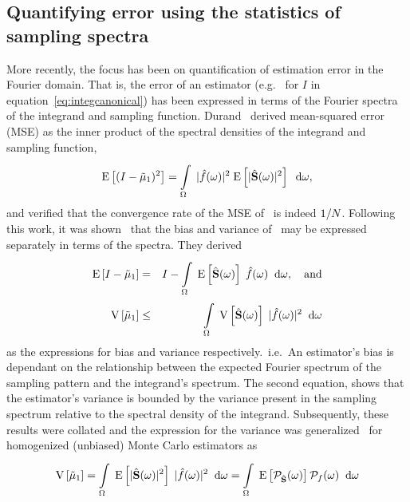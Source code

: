 \subsection{Quantifying error using the statistics of sampling spectra}
More recently, the focus has been on quantification of estimation error in the Fourier domain. That is, the error of an estimator (e.g.~ for $I$ in equation~\ref{eq:integcanonical}) has been expressed in terms of the Fourier spectra of the integrand and sampling function. 
Durand~\cite{durand2011frequency} derived mean-squared error (MSE) as the inner product of the spectral densities of the integrand and sampling function, 
\begin{equation} \label{eq:durand11}
   \mathrm{E} \left[(I-\tilde\mu_\mathrm{1})^2 \right] = \displaystyle\int\limits_{\Omega}^{} \; |\hat{f}(\omega)|^2 \; \mathrm{E} \left[|\hat{\mathbf{S}}(\omega)|^2 \right] \;\; \mathrm{d}\omega,
\end{equation}
and verified that the convergence rate of the MSE of \estim{\N}\ is indeed $1/N$. Following this work, it was shown~\cite{Subr:2013:FAS} that the bias and variance of \ may be expressed separately in terms of the spectra. They derived
\begin{eqnarray}
  \mathrm{E} \left[I-\tilde\mu_\mathrm{1} \right] &=& I - \displaystyle\int\limits_{\Omega}^{} \; \mathrm{E} \left[\hat{\mathbf{S}}(\omega) \right] \; \hat{f}(\omega)  \;\; \mathrm{d}\omega, \quad \mathrm{and} \\
    \mathrm{V} \left[\tilde\mu_\mathrm{1}\right] &\leq& \displaystyle\int\limits_{\Omega}^{} \; \mathrm{V} \left[\hat{\mathbf{S}}(\omega)\right] \; |\hat{f}(\omega)|^2 \;\; \mathrm{d}\omega
\end{eqnarray}
as the expressions for bias and variance respectively.~i.e.~An estimator's bias is dependant on the relationship between the expected Fourier spectrum of the sampling pattern and the integrand's spectrum. The second equation, shows that the estimator's variance is bounded by the variance present in the sampling spectrum relative to the spectral density of the integrand. Subsequently, these results were collated and the expression for the variance was generalized~\cite{Pilleboue:2015:VAM} for homogenized (unbiased) Monte Carlo estimators as
%
\begin{equation} \label{eq:pillebouevar}
\mathrm{V} \left[\tilde\mu_\mathrm{1}\right] 
= \displaystyle\int\limits_{\Omega}^{} \; \mathrm{E} \left[|\hat{\mathbf{S}}(\omega)|^2 \right]\;|\hat{f}(\omega)|^2 \;\; \mathrm{d}\omega 
= \displaystyle\int\limits_{\Omega}^{} \; \mathrm{E} \left[\mathcal{P}_{\hat{\mathbf{S}}}(\omega) \right] \mathcal{P}_{f}(\omega) \;\; \mathrm{d}\omega 
\end{equation}
